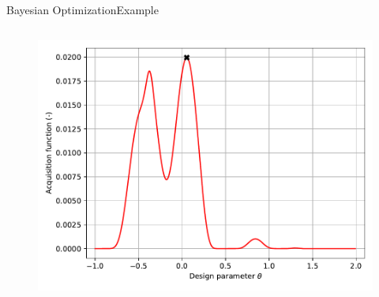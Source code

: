 \documentclass{beamer}
\begin{document}
\begin{frame}{Bayesian Optimization}{Example}
\begin{columns}
{\begin{figure}
    \includegraphics[width=\textwidth]{img/BO/BO_acq_19.pdf}
\end{figure}
}
\end{columns}
\end{frame}
\end{document}
